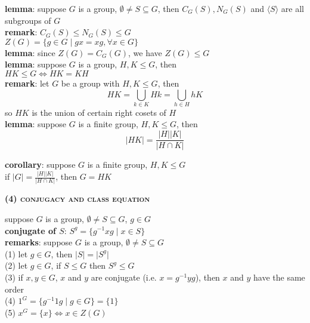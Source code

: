 \documentclass[a4paper]{article}
\newcommand\abs[1]{\ensuremath{\lvert#1\rvert}}
\begin{document}
\begin{multicols}{2}
\begin{framed}
	\noindent
	\textbf{lemma}: suppose $G$ is a group, $\emptyset \neq S \subseteq G$, then $C_G(S), N_G(S)$ and $\langle S \rangle$ are all subgroups of $G$\\
	
	\noindent
	\textbf{remark}: $C_G(S) \leq N_G(S) \leq G$\\

	\noindent
	$Z(G) = \{g \in G \; \vert \; gx = xg, \forall x \in G\}$\\
	
	\noindent
	\textbf{lemma}: since $Z(G) = C_G(G)$, we have $Z(G) \leq G$\\
	
	\noindent
	\textbf{lemma}: suppose $G$ is a group, $H, K \leq G$, then\\
	$HK \leq G \iff HK = KH$	\\
	
	\noindent
	\textbf{remark}: let $G$ be a group with $H, K \leq G$, then
	$$HK = \bigcup_{k \in K}Hk = \bigcup_{h \in H}hK$$
	so $HK$ is the union of certain right cosets of $H$\\
	
	\noindent
	\textbf{lemma}: suppose $G$ is a finite group, $H, K \leq G$, then
	$$\abs{HK} = \frac{\abs{H}\abs{K}}{\abs{H \cap K}}$$
	
	\noindent
	\textbf{corollary}: suppose $G$ is a finite group, $H, K \leq G$\\
	if $\abs{G} = \frac{\abs{H}\abs{K}}{\abs{H \cap K}}$, then $G = HK$
\end{framed}

\begin{framed}
	\begin{center}
		\textbf{\textsc{(4) conjugacy and class equation}}
	\end{center}
	
	\noindent
	suppose $G$ is a group, $\emptyset \neq S \subseteq G$, $g \in G$\\\textbf{conjugate of $S$}: $S^g = \{g^{-1}xg \; \vert \; x \in S\}$\\
	
	\noindent
	\textbf{remarks}: suppose $G$ is a group, $\emptyset \neq S \subseteq G$\\
	(1) let $g \in G$, then $\abs{S} = \abs{S^g}$\\
	(2) let $g \in G$, if $S \leq G$ then $S^g \leq G$\\
	(3) if $x, y \in G$, $x$ and $y$ are conjugate (i.e. $x = g^{-1}yg$), then $x$ and $y$ have the same order\\
	(4) $1^G = \{g^{-1}1g \; \vert \; g \in G\} = \{1\}$\\
	(5) $x^G = \{x\} \iff x \in Z(G)$\\
	

\end{framed}
\end{multicols}
\end{document}
